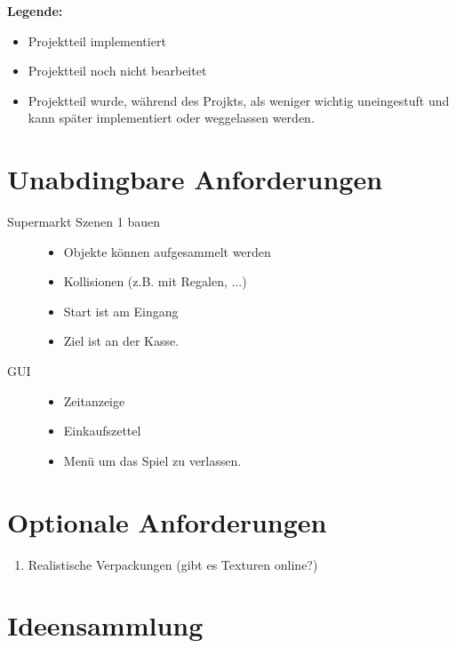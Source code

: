﻿\documentclass[a4paper, 11pt]{scrartcl}
\title{\documenttitle}
\author{\authors}
\date{\dateversion}
\newcommand{\fertig}{\color{ForestGreen}}
\newcommand{\unwichtig}{\color{Gray}}
\begin{document}
\maketitle

{\bfseries Legende:}
\begin{itemize}
    \item {\fertig Projektteil implementiert}
    \item {Projektteil noch nicht bearbeitet}
    \item {\unwichtig Projektteil wurde, während des Projkts, als weniger
    wichtig uneingestuft und kann später implementiert oder weggelassen werden.}
\end{itemize}

\section{Unabdingbare Anforderungen}
\begin{description}
    \item[Supermarkt Szenen 1 bauen]
    \begin{itemize}
        \item Objekte können aufgesammelt werden
        \item Kollisionen (z.B. mit Regalen, ...)
        \item Start ist am Eingang
        \item Ziel ist an der Kasse.
    \end{itemize}
    \item[GUI]
    \begin{itemize}
        \item Zeitanzeige
        \item Einkaufszettel
        \item Menü um das Spiel zu verlassen.
    \end{itemize}
\end{description}


\section{Optionale Anforderungen}
\begin{enumerate}
    \item Realistische Verpackungen (gibt es Texturen online?)
\end{enumerate}


\section{Ideensammlung}
\end{document}
